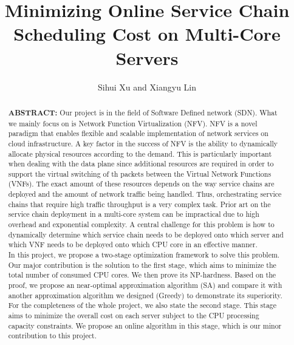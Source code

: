 \documentclass{acmtog}
\begin{document}
\title{Minimizing Online Service Chain Scheduling Cost on Multi-Core Servers} %

\author{Sihui Xu {\upshape and} Xiangyu Lin
}
\maketitle


\begin{abstract}
\textbf{ABSTRACT: } Our project is in the field of Software Defined network (SDN). What we mainly focus on is Network Function Virtualization (NFV). NFV is a novel paradigm that enables flexible and scalable implementation of network services on cloud infrastructure. A key factor in the success of NFV is the ability to dynamically allocate physical resources according to the demand. This is particularly important when dealing with the data plane since additional resources are required in order to support the virtual switching of th packets between the Virtual Network Functions (VNFs). The exact amount of these resources depends on the way service chains are deployed and the amount of network traffic being handled. Thus, orchestrating service chains that require high traffic throughput is a very complex task. Prior art on the service chain deployment in a multi-core system can be impractical due to high overhead and exponential complexity. A central challenge for this problem is how to dynamically determine which service chain needs to be deployed onto which server and which VNF needs to be deployed onto which CPU core in an effective manner. 
\\\indent In this project, we propose a two-stage optimization framework to solve this problem. Our major contribution is the solution to the first stage, which aims to minimize the total number of consumed CPU cores. We then prove its NP-hardness. Based on the proof, we propose an near-optimal approximation algorithm (SA) and compare it with another approximation algorithm we designed (Greedy) to demonstrate its superiority. 
\\\indent For the completeness of the whole project, we also state the second stage. This stage aims to  minimize the overall cost on each server subject to the CPU processing capacity constraints. We propose an online algorithm in this stage, which is our minor contribution to this project. 
\end{abstract}
\end{document}

